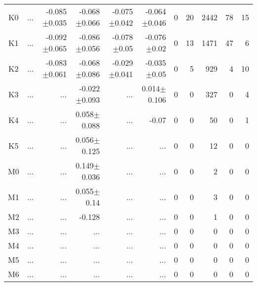 \begin{table}[t]
\begin{center}
\begin{tabular}{c|rrrrr|rrrrr}
K0	&	 ...	&	-0.085$\pm$0.035	&	-0.068$\pm$0.066	&	-0.075$\pm$0.042	&	-0.064$\pm$0.046	&	0	&	20	&	2442	&	78	&	15	\\
K1	&	 ...	&	-0.092$\pm$0.065	&	-0.086$\pm$0.056	&	-0.078$\pm$0.05	&	-0.076$\pm$0.02	&	0	&	13	&	1471	&	47	&	6	\\
K2	&	 ...	&	-0.083$\pm$0.061	&	-0.068$\pm$0.086	&	-0.029$\pm$0.041	&	-0.035$\pm$0.05	&	0	&	5	&	929	&	4	&	10	\\
K3	&	 ...	&	 ...	&	-0.022$\pm$0.093	&	 ...	&	0.014$\pm$0.106	&	0	&	0	&	327	&	0	&	4	\\
K4	&	 ...	&	 ...	&	0.058$\pm$0.088	&	 ...	&	-0.07	&	0	&	0	&	50	&	0	&	1	\\
K5	&	 ...	&	 ...	&	0.056$\pm$0.125	&	 ...	&	 ...	&	0	&	0	&	12	&	0	&	0	\\
M0	&	 ...	&	 ...	&	0.149$\pm$0.036	&	 ...	&	 ...	&	0	&	0	&	2	&	0	&	0	\\
M1	&	 ...	&	 ...	&	0.055$\pm$0.14	&	 ...	&	 ...	&	0	&	0	&	3	&	0	&	0	\\
M2	&	 ...	&	 ...	&	-0.128	&	 ...	&	 ...	&	0	&	0	&	1	&	0	&	0	\\
M3	&	 ...	&	 ...	&	 ...	&	 ...	&	 ...	&	0	&	0	&	0	&	0	&	0	\\
M4	&	 ...	&	 ...	&	 ...	&	 ...	&	 ...	&	0	&	0	&	0	&	0	&	0	\\
M5	&	 ...	&	 ...	&	 ...	&	 ...	&	 ...	&	0	&	0	&	0	&	0	&	0	\\
M6	&	 ...	&	 ...	&	 ...	&	 ...	&	 ...	&	0	&	0	&	0	&	0	&	0	\\
    \bottomrule
    \end{tabular}
\end{center}
\end{table}


